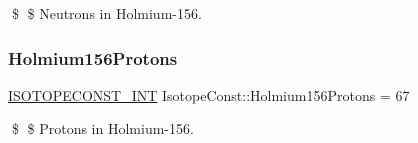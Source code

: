 \$ \$ Neutrons in Holmium-\/156. \mbox{\label{group___isotope_const-_holmium-_ho156_ga486e6953ce25848d51a2db166c0c9360}} 
\subsubsection{\texorpdfstring{Holmium156\+Protons}{Holmium156Protons}}
{\footnotesize\ttfamily \mbox{\hyperlink{group___isotope_const-_macros_ga5f18360b3e99483a35c32d789e62621c}{I\+S\+O\+T\+O\+P\+E\+C\+O\+N\+S\+T\+\_\+\+I\+NT}} Isotope\+Const\+::\+Holmium156\+Protons = 67}

\$ \$ Protons in Holmium-\/156. 